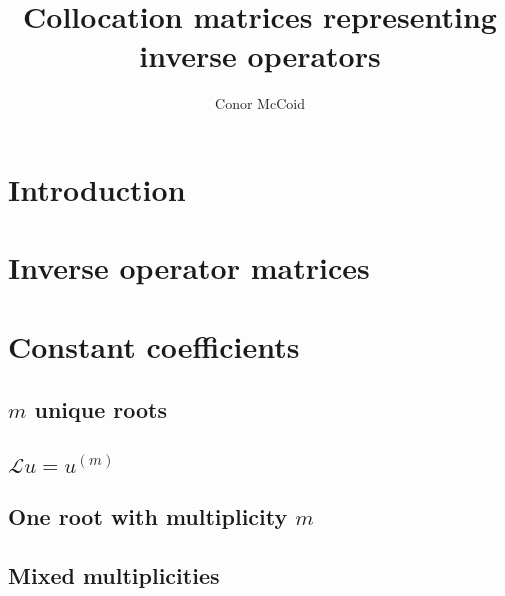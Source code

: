 \documentclass{article}
\title{Collocation matrices representing inverse operators}
\author{Conor McCoid}
\begin{document}
\maketitle

\section{Introduction}


\section{Inverse operator matrices}

\section{Constant coefficients}

\subsection{$m$ unique roots}

\subsection{$\mathcal{L} u = u^{(m)}$}

\subsection{One root with multiplicity $m$}

\subsection{Mixed multiplicities}
\end{document}
